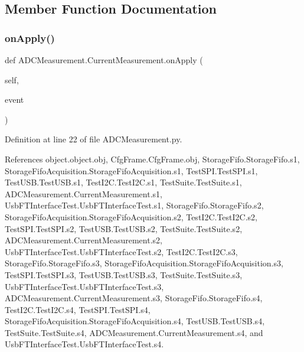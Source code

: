 \subsection{Member Function Documentation}
\mbox{\label{classADCMeasurement_1_1CurrentMeasurement_a1ae6055f5228952c14ea04fe83db0cb4}} 
\subsubsection{\texorpdfstring{on\+Apply()}{onApply()}}
{\footnotesize\ttfamily def A\+D\+C\+Measurement.\+Current\+Measurement.\+on\+Apply (\begin{DoxyParamCaption}\item[{}]{self,  }\item[{}]{event }\end{DoxyParamCaption})}



Definition at line 22 of file A\+D\+C\+Measurement.\+py.



References object.\+object.\+obj, Cfg\+Frame.\+Cfg\+Frame.\+obj, Storage\+Fifo.\+Storage\+Fifo.\+s1, Storage\+Fifo\+Acquisition.\+Storage\+Fifo\+Acquisition.\+s1, Test\+S\+P\+I.\+Test\+S\+P\+I.\+s1, Test\+U\+S\+B.\+Test\+U\+S\+B.\+s1, Test\+I2\+C.\+Test\+I2\+C.\+s1, Test\+Suite.\+Test\+Suite.\+s1, A\+D\+C\+Measurement.\+Current\+Measurement.\+s1, Usb\+F\+T\+Interface\+Test.\+Usb\+F\+T\+Interface\+Test.\+s1, Storage\+Fifo.\+Storage\+Fifo.\+s2, Storage\+Fifo\+Acquisition.\+Storage\+Fifo\+Acquisition.\+s2, Test\+I2\+C.\+Test\+I2\+C.\+s2, Test\+S\+P\+I.\+Test\+S\+P\+I.\+s2, Test\+U\+S\+B.\+Test\+U\+S\+B.\+s2, Test\+Suite.\+Test\+Suite.\+s2, A\+D\+C\+Measurement.\+Current\+Measurement.\+s2, Usb\+F\+T\+Interface\+Test.\+Usb\+F\+T\+Interface\+Test.\+s2, Test\+I2\+C.\+Test\+I2\+C.\+s3, Storage\+Fifo.\+Storage\+Fifo.\+s3, Storage\+Fifo\+Acquisition.\+Storage\+Fifo\+Acquisition.\+s3, Test\+S\+P\+I.\+Test\+S\+P\+I.\+s3, Test\+U\+S\+B.\+Test\+U\+S\+B.\+s3, Test\+Suite.\+Test\+Suite.\+s3, Usb\+F\+T\+Interface\+Test.\+Usb\+F\+T\+Interface\+Test.\+s3, A\+D\+C\+Measurement.\+Current\+Measurement.\+s3, Storage\+Fifo.\+Storage\+Fifo.\+s4, Test\+I2\+C.\+Test\+I2\+C.\+s4, Test\+S\+P\+I.\+Test\+S\+P\+I.\+s4, Storage\+Fifo\+Acquisition.\+Storage\+Fifo\+Acquisition.\+s4, Test\+U\+S\+B.\+Test\+U\+S\+B.\+s4, Test\+Suite.\+Test\+Suite.\+s4, A\+D\+C\+Measurement.\+Current\+Measurement.\+s4, and Usb\+F\+T\+Interface\+Test.\+Usb\+F\+T\+Interface\+Test.\+s4.



